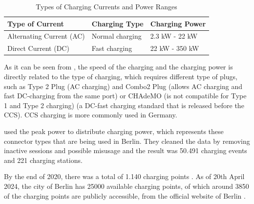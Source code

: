 \begin{table}[h!]
\centering
\begin{tabular}{|l|l|l|}
\hline
\textbf{Type of Current} & \textbf{Charging Type} & \textbf{Charging Power} \\ \hline
Alternating Current (\gls{AC}) & Normal charging        & 2.3 kW - 22 kW           \\ \hline
Direct Current (\gls{DC})      & Fast charging          & 22 kW - 350 kW           \\ \hline
\end{tabular}
\caption{Types of Charging Currents and Power Ranges}
\label{tab:charging}
\end{table}

As it can be seen from \cite{EMOBerlin}, the speed of the charging and the charging power is directly related to the type of charging, which requires different type of plugs, such as Type 2 Plug (AC charging) and Combo2 Plug (allows AC charging and fast DC-charging from the same port) or CHAdeMO (is not compatible for Type 1 and Type 2 charging) (a DC-fast charging standard that is released before the CCS). CCS charging is more commonly used in Germany.

\cite{Hardinghaus2020} used the peak power to distribute charging power, which represents these connector types that are being used in Berlin. They cleaned the data by removing inactive sessions and possible misusage and the result was 50.491 charging events and 221 charging stations.

By the end of 2020, there was a total of 1.140 charging points \cite{BerlinStudy2025}. As of 20th April 2024, the city of Berlin has 25000 available charging points, of which around 3850 of the charging points are publicly accessible, from the official website of Berlin \cite{BerlinCampaign2024}.

